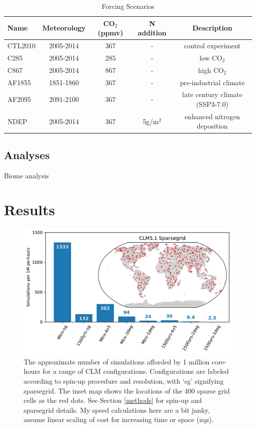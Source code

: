 \documentclass[draft]{agujournal2019}
\begin{document}
\label{sect:exps}
 \begin{table}[h]
 \caption{Forcing Scenarios}
 \centering
 \begin{tabular}{l c c c c}
 \hline
  Name  & Meteorology & CO$_2$ (ppmv) & N addition & Description \\
 \hline
   CTL2010  & 2005-2014 & 367 & - & control experiment\\
   C285        & 2005-2014 & 285 & - & low CO$_2$ \\
   C867        & 2005-2014 & 867 & - & high CO$_2$ \\
   AF1855    & 1851-1860 & 367 & - & pre-industrial climate \\
   AF2095    & 2091-2100 & 367 & - & late century climate (SSP3-7.0) \\
   NDEP      & 2005-2014 & 367 & 5g/m$^2$ & enhanced nitrogen deposition \\
 \hline
 \end{tabular}
 \label{tab:exps}
 \end{table}

\subsection{Analyses}

Biome analysis

\section{Results}

\begin{figure}[h]
\centering
\includegraphics[width=30pc]{../figs/sims.pdf}
\caption{The approximate number of simulations afforded by 1 million core-hours for a range of CLM configurations. Configurations are labeled according to spin-up procedure and resolution, with `sg' signifying sparsegrid. The inset map shows the locations of the 400 sparse grid cells as the red dots. See Section \ref{methods} for spin-up and sparsegrid details. My speed calculations here are a bit janky, assume linear scaling of cost for increasing time or space (zqz). }
\label{fig:sims}
\end{figure}
\end{document}
